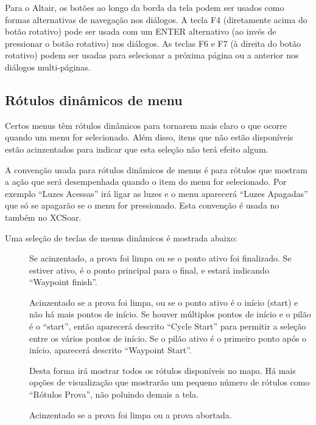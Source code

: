 Para o Altair, os botões ao longo da borda da tela podem ser usados como formas alternativas de navegação nos diálogos.  A tecla F4 (diretamente acima do botão rotativo) pode ser usada com um ENTER alternativo (ao invés de pressionar o botão rotativo) nos diálogos.  As teclas F6 e F7 (à direita do botão rotativo) podem ser usadas para selecionar a próxima página ou a anterior nos diálogos multi-páginas.

\subsection*{Rótulos dinâmicos de menu}
Certos menus têm rótulos dinâmicos para tornarem mais claro o que ocorre quando um menu for selecionado.  Além disso, itens que não estão disponíveis estão acinzentados para indicar que esta seleção não terá efeito algum.

A convenção usada para rótulos dinâmicos de menus é para rótulos que mostram a ação que será desempenhada quando o item do menu for selecionado.  Por exemplo “Luzes Acessas” irá ligar as luzes e o menu aparecerá “Luzes Apagadas” que só se apagarão se o menu for pressionado.  Esta convenção é usada no também no XCSoar.

Uma seleção de teclas de menus dinâmicos é mostrada abaixo:

\begin{description}
\item[]  
 Se acinzentado, a prova foi limpa ou se o ponto ativo foi finalizado.  Se estiver ativo, é o ponto principal para o final, e estará indicando “Waypoint finish”.
\item[]  
  Acinzentado se a prova foi limpa, ou se o ponto ativo é o início (start) e não há mais pontos de início.  Se houver múltiplos pontos de início e o pilão é o “start”, então aparecerá descrito “Cycle Start” para permitir a seleção entre os vários pontos de início.  Se o pilão ativo é o primeiro ponto após o início, aparecerá descrito “Waypoint Start”. 
\item[]  
 Desta forma irá mostrar todos os rótulos disponíveis no mapa.  Há mais opções de visualização que mostrarão um pequeno número de rótulos como “Rótulos Prova”, não poluindo demais a tela.
\item[]  
  Acinzentado se a prova foi limpa ou a prova abortada.

\end{description}


